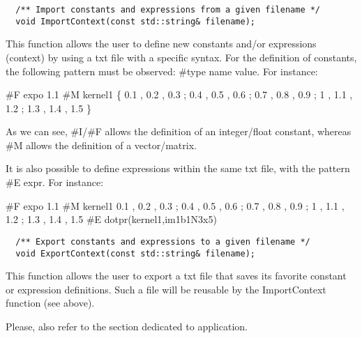 \begin{verbatim}
  /** Import constants and expressions from a given filename */
  void ImportContext(const std::string& filename);
\end{verbatim}

This function allows the user to define new constants and/or expressions (context) by using a txt file with a specific syntax.
For the definition of constants, the following pattern must be observed:
\newline  \#type name value. 
\newline For instance:


\#F expo 1.1 \newline 
\#M kernel1 \{ 0.1 , 0.2 , 0.3 ; 0.4 , 0.5 , 0.6 ; 0.7 , 0.8 , 0.9 ; 1 , 1.1 , 1.2 ; 1.3 , 1.4 , 1.5 \} \newline


As we can see,  \#I/\#F allows the definition of an integer/float constant, whereas \#M allows the definition of a vector/matrix. 

It is also possible to define expressions within the same txt file, with the pattern \#E expr. For instance:


\#F expo 1.1 \newline 
\#M kernel1 { 0.1 , 0.2 , 0.3 ; 0.4 , 0.5 , 0.6 ; 0.7 , 0.8 , 0.9 ; 1 , 1.1 , 1.2 ; 1.3 , 1.4 , 1.5 } \newline 
\#E dotpr(kernel1,im1b1N3x5) \newline

\begin{verbatim}
  /** Export constants and expressions to a given filename */
  void ExportContext(const std::string& filename);
\end{verbatim}

This function allows the user to export a txt file that saves its favorite constant or expression definitions. Such a file will be reusable by the ImportContext function (see above).


\newline 
\newline 
Please, also refer to the section dedicated to  application.



